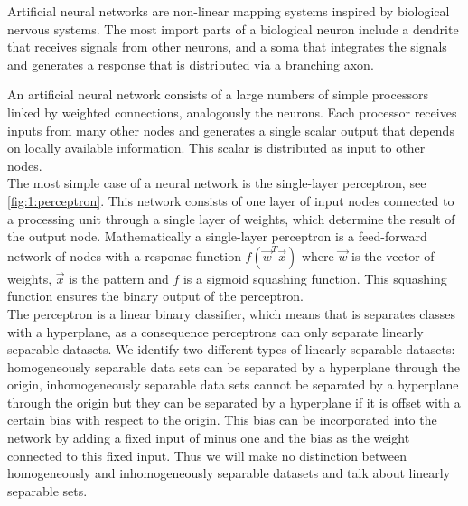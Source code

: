 Artificial neural networks are non-linear mapping systems inspired by biological nervous systems. The most import parts of a biological neuron include a dendrite that receives signals from other neurons, and a soma that integrates the signals and generates a response that is distributed via a branching axon. 

An artificial neural network consists of a large numbers of simple processors linked by weighted connections, analogously the neurons. Each processor receives inputs from many other nodes and generates a single scalar output that depends on locally available information. This scalar is distributed as input to other nodes. \\

The most simple case of a neural network is the single-layer perceptron, see \autoref{fig:1:perceptron}. This network consists of one layer of input nodes connected to a processing unit through a single layer of weights, which determine the result of the output node. Mathematically a single-layer perceptron is a feed-forward network of nodes with a response function $f(\vec{w}^T\vec{x})$ where $\vec{w}$ is the vector of weights, $\vec{x}$ is the pattern and $f$ is a sigmoid squashing function\cite{reed1998neural}. This squashing function ensures the binary output of the perceptron. \\

The perceptron is a linear binary classifier, which means that is separates classes with a hyperplane, as a consequence perceptrons can only separate linearly separable datasets. We identify two different types of linearly separable datasets: homogeneously separable data sets can be separated by a hyperplane through the origin, inhomogeneously separable data sets cannot be separated by a hyperplane through the origin but they can be separated by a hyperplane if it is offset with a certain bias with respect to the origin. This bias can be incorporated into the network by adding a fixed input of minus one and the bias as the weight connected to this fixed input. Thus we will make no distinction between homogeneously and inhomogeneously separable datasets and talk about linearly separable sets. 


